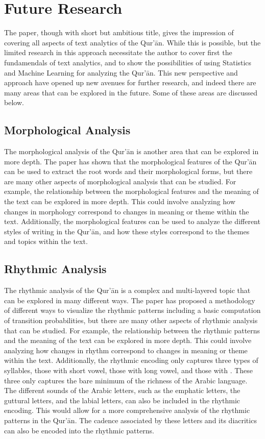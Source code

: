 \chapter{Future Research}\label{ch:future_research}
The paper, though with short but ambitious title, gives the impression of covering all aspects of text analytics of the Qur'\=an. While this is possible, but the limited research in this approach necessitate the author to cover first the fundamendals of text analytics, and to show the possibilities of using Statistics and Machine Learning for analyzing the Qur'\=an. This new perspective and approach have opened up new avenues for further research, and indeed there are many areas that can be explored in the future. Some of these areas are discussed below.

\section{Morphological Analysis}
The morphological analysis of the Qur'\=an is another area that can be explored in more depth. The paper has shown that the morphological features of the Qur'\=an can be used to extract the root words and their morphological forms, but there are many other aspects of morphological analysis that can be studied. For example, the relationship between the morphological features and the meaning of the text can be explored in more depth. This could involve analyzing how changes in morphology correspond to changes in meaning or theme within the text. Additionally, the morphological features can be used to analyze the different styles of writing in the Qur'\=an, and how these styles correspond to the themes and topics within the text.

\section{Rhythmic Analysis}
The rhythmic analysis of the Qur'\=an is a complex and multi-layered topic that can be explored in many different ways. The paper has proposed a methodology of different ways to visualize the rhythmic patterns including a basic computation of transition probabilities, but there are many other aspects of rhythmic analysis that can be studied. For example, the relationship between the rhythmic patterns and the meaning of the text can be explored in more depth. This could involve analyzing how changes in rhythm correspond to changes in meaning or theme within the text. Additionally, the rhythmic encoding only captures three types of syllables, those with short vowel, those with long vowel, and those with  . These three only captures the bare minimum of the richness of the Arabic language. The different sounds of the Arabic letters, such as the emphatic letters, the guttural letters, and the labial letters, can also be included in the rhythmic encoding. This would allow for a more comprehensive analysis of the rhythmic patterns in the Qur'\=an. The cadence associated by these letters and its diacritics can also be encoded into the rhythmic patterns. 

